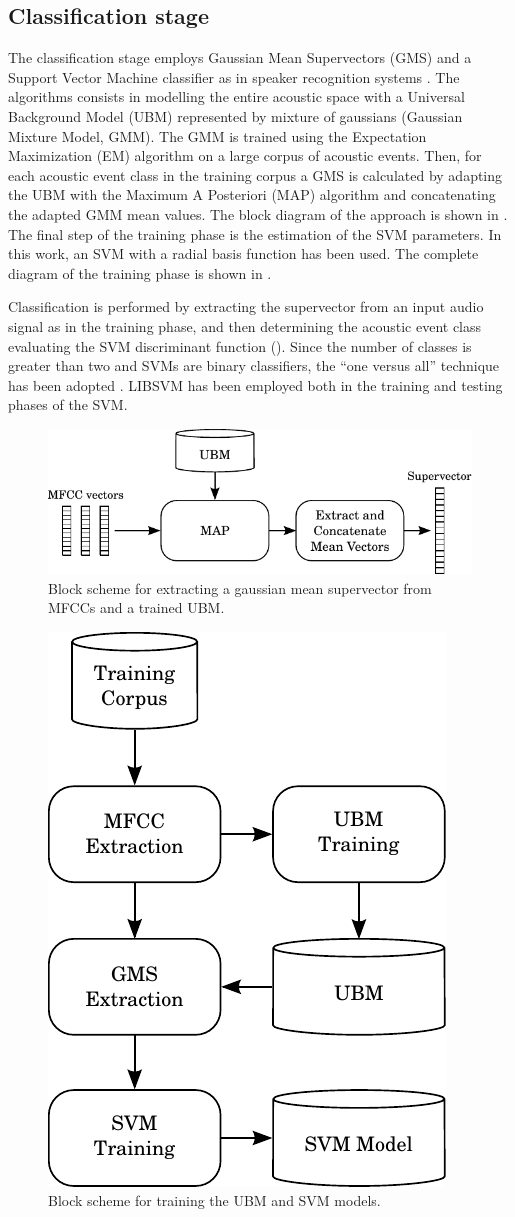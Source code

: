 \subsection{Classification stage}
The classification stage employs Gaussian Mean Supervectors (GMS) and a Support Vector Machine classifier as in speaker recognition systems \cite{kinnunen10}. The algorithms consists in modelling the entire acoustic space with a Universal Background Model (UBM) represented by mixture of gaussians (Gaussian Mixture Model, GMM). The GMM is trained using the Expectation Maximization (EM) algorithm \cite{bilmes1998gentle} on a large corpus of acoustic events. Then, for each acoustic event class in the training corpus a GMS is calculated by adapting the UBM with the Maximum A Posteriori (MAP) algorithm \cite{reynolds10} and concatenating the adapted GMM mean values. The block diagram of the approach is shown in . The final step of the training phase is the estimation of the SVM parameters. In this work, an SVM with a radial basis function has been used. The complete diagram of the training phase is shown in .

Classification is performed by extracting the supervector from an input audio signal as in the training phase, and then determining the acoustic event class evaluating the SVM discriminant function (). Since the number of classes is greater than two and SVMs are binary classifiers, the ``one versus all''  technique has been adopted \cite{bishop06}. LIBSVM \cite{chang11} has been employed both in the training and testing phases of the SVM.

\begin{figure}[t]
	\centering
	\includegraphics[width=0.75\columnwidth]{img/gms_bn.pdf}
	\caption{Block scheme for extracting a gaussian mean supervector from MFCCs and a trained UBM.} \label{fig:gms}
\end{figure}

\begin{figure}[t]
	\centering
	\includegraphics[width=0.3334\columnwidth]{img/training_scheme.pdf}
	\caption{Block scheme for training the UBM and SVM models.}
	\label{fig:training-scheme}
\end{figure}

